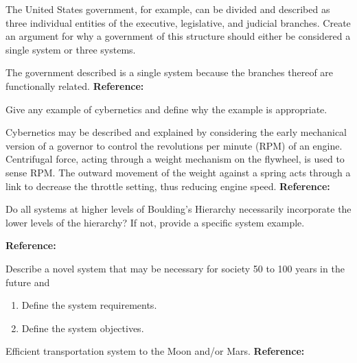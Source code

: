 \begin{exercises}
    \begin{exercise} 
    \label{sea-01-17}
        The United States government, for example, can be divided and described as three individual entities of the executive, legislative, and judicial branches. Create an argument for why a government of this structure should either be considered a single system or three systems.
    \end{exercise}
    \begin{solution}
        The government described is a single system because the branches thereof are functionally related. \textbf{Reference:}
    \end{solution}
    
    \begin{exercise} 
    \label{sea-01-19}
        Give any example of cybernetics and define why the example is appropriate.
    \end{exercise}
    \begin{solution}
        Cybernetics may be described and explained by considering the early mechanical version of a governor to control the revolutions per minute (RPM) of an engine. Centrifugal force, acting through a weight mechanism on the flywheel, is used to sense RPM. The outward movement of the weight against a spring acts through a link to decrease the throttle setting, thus reducing engine speed. \textbf{Reference:}
    \end{solution}
    
    \begin{exercise} 
    \label{sea-01-21}
        Do all systems at higher levels of Boulding's Hierarchy necessarily incorporate the lower levels of the hierarchy? If not, provide a specific system example.
    \end{exercise}
    \begin{solution}
        \textbf{Reference:}
    \end{solution}
    
    \begin{exercise} 
    \label{sea-01-22}
        Describe a novel system that may be necessary for society 50 to 100 years in the future and
        \begin{enumerate}[label=\alph*)]
            \item Define the system requirements.
            \item Define the system objectives.
        \end{enumerate}
    \end{exercise}
    \begin{solution}
        Efficient transportation system to the Moon and/or Mars. \textbf{Reference:}
    \end{solution}
    

\end{exercises}
